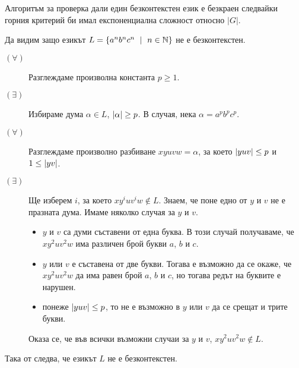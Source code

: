 \begin{remark}
  Алгоритъм за проверка дали един безконтекстен език е безкраен следвайки горния критерий би 
  имал експоненциална сложност относно $|G|$.
\end{remark}

\begin{example}
  \label{ex:anbncn}
  Да видим защо езикът $L = \{a^nb^nc^n\ \mid\ n\in\mathbb{N}\}$ не е безконтекстен.
  \begin{description}
  \item[$(\forall)$]
    Разглеждаме произволна константа $p \geq 1$.
  \item[$(\exists)$]
    Избираме дума $\alpha \in L$, $\vert{\alpha}\vert \geq p$.
    В случая, нека $\alpha = a^pb^pc^p$.
  \item[$(\forall)$]
    Разглеждаме произволно разбиване $xyuvw = \alpha$, за което $\vert{yuv}\vert \leq p$ и $1 \leq \vert{yv}\vert$.
  \item[$(\exists)$]
    Ще изберем $i$, за което $xy^iuv^iw \not\in L$.
    Знаем, че поне едно от $y$ и $v$ не е празната дума.
    Имаме няколко случая за $y$ и $v$.
    \begin{itemize}
    \item
      $y$ и $v$ са думи съставени от една буква.
      В този случай получаваме, че $xy^2uv^2w$ има различен брой букви $a$, $b$ и $c$.
    \item
      $y$ или $v$ е съставена от две букви.
      Тогава е възможно да се окаже, че $xy^2uv^2w$ да има равен брой $a$, $b$ и $c$,
      но тогава редът на буквите е нарушен.
    \item
      понеже $\vert{yuv}\vert \leq p$, то не е възможно в $y$ или $v$ да се срещат и трите букви.
    \end{itemize}  
    Оказа се, че във всички възможни случаи за $y$ и $v$, 
    $xy^2uv^2w \not\in L$.
  \end{description}
  Така от  следва, че езикът $L$ не е безконтекстен.
\end{example}

